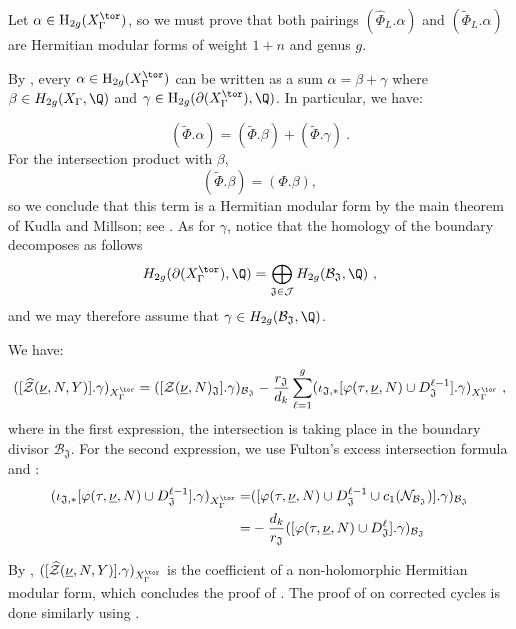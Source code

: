 \documentclass[11pt,letterpaper,english]{amsart}
\numberwithin{equation}{subsection}
\numberwithin{equation}{section}
\newcommand\cB{{\mathcal B}}
\newcommand\cJ{{\mathcal J}}
\newcommand\cN{{\mathcal N}}
\newcommand\cZ{{\mathcal Z}}
\newcommand\fJ{{\mathfrak J}}
\theoremstyle{plain}
\theoremstyle{remark}
\newtheorem{remarque}[theorem]{Remark}
\begin{document}

Let $\alpha \in \mathrm{H}_{2g}(X_\Gamma^{\tor})$, so we must prove that both pairings $(\widehat{\Phi}_L.\alpha)$ and $(\widetilde{\Phi}_L.\alpha)$ are Hermitian modular forms of weight $1+n$ and genus $g$.


By , every $\alpha\in \mathrm{H}_{2g}(X_\Gamma^{\tor})$ can be written as a sum $\alpha=\beta+\gamma$ where $\beta\in H_{2g}(X_\Gamma,\Q)$ and   $\gamma\in \mathrm{H}_{2g}(\partial(X_\Gamma^{\tor}),\Q)$. In particular, we have: 

\[\left(\widetilde \Phi.\alpha\right)=\left(\widetilde \Phi.\beta\right)+\left(\widetilde \Phi.\gamma\right)~.\]
For the intersection product with $\beta$,
\[\left(\widetilde \Phi.\beta\right)=\left(\Phi.\beta\right),\]
so we conclude that this term is a Hermitian modular form by the main theorem of Kudla and Millson; see \cite{kudla-millson}. As for $\gamma$, notice that the homology of the boundary decomposes as follows
\[H_{2g}(\partial(X_\Gamma^{\tor}),\Q)=\bigoplus _{\fJ\in \cJ}H_{2g}(\cB_\fJ,\Q)~,\]
and we may therefore assume that $\gamma\in H_{2g}(\cB_\fJ,\Q)$.

We have:
\[([\widehat{\cZ}(\underline{\nu},N,Y)].\gamma)_{X^{\tor}_{\Gamma}}=([\cZ(\underline{\nu},N)_{\fJ}].\gamma)_{\cB_\fJ}-\frac{r_\fJ}{d_k}\sum_{\ell=1}^g(\iota_{\fJ,*}[\varphi(\tau,\underline{\nu},N)\cup D_{\fJ}^{\ell-1}].\gamma)_{X_\Gamma^{\tor}}~,\]
where in the first expression, the intersection is taking place in the boundary divisor $\cB_\fJ$. For the second expression, we use Fulton's excess intersection formula and :
\begin{align*}(\iota_{\fJ,*}[\varphi(\tau,\underline{\nu},N)\cup D_{\fJ}^{\ell-1}].\gamma)_{X_\Gamma^{\tor}}=&([\varphi(\tau,\underline{\nu},N)\cup D_{\fJ}^{\ell-1}\cup c_1(\cN_{\cB_\fJ})].\gamma)_{\cB_\fJ}\\
=&-\frac{d_k}{r_\fJ}([\varphi(\tau,\underline{\nu},N)\cup D_{\fJ}^{\ell}].\gamma)_{\cB_\fJ}
\end{align*}


By , $([\widehat{\cZ}(\underline{\nu},N,Y)].\gamma)_{X^{\tor}_{\Gamma}}$ is the coefficient of a non-holomorphic Hermitian modular form, which concludes the proof of . The proof of  on corrected cycles is done similarly using . 


\end{document}
